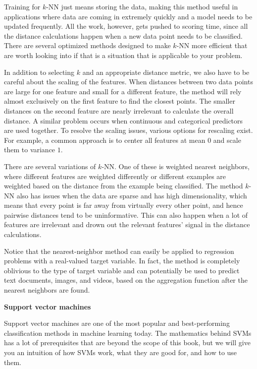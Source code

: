 \documentclass[]{krantz}
\begin{document}
Training for \(k\)-NN just means storing the data, making this method
useful in applications where data are coming in extremely quickly and a
model needs to be updated frequently. All the work, however, gets pushed
to scoring time, since all the distance calculations happen when a new
data point needs to be classified. There are several optimized methods
designed to make \(k\)-NN more efficient that are worth looking into if
that is a situation that is applicable to your problem.

In addition to selecting \(k\) and an appropriate distance metric, we
also have to be careful about the scaling of the features. When
distances between two data points are large for one feature and small
for a different feature, the method will rely almost exclusively on the
first feature to find the closest points. The smaller distances on the
second feature are nearly irrelevant to calculate the overall distance.
A similar problem occurs when continuous and categorical predictors are
used together. To resolve the scaling issues, various options for
rescaling exist. For example, a common approach is to center all
features at mean \(0\) and scale them to variance \(1\).

There are several variations of \(k\)-NN. One of these is weighted
nearest neighbors, where different features are weighted differently or
different examples are weighted based on the distance from the example
being classified. The method \(k\)-NN also has issues when the data are
sparse and has high dimensionality, which means that every point is far
away from virtually every other point, and hence pairwise distances tend
to be uninformative. This can also happen when a lot of features are
irrelevant and drown out the relevant features' signal in the distance
calculations.

Notice that the nearest-neighbor method can easily be applied to
regression problems with a real-valued target variable. In fact, the
method is completely oblivious to the type of target variable and can
potentially be used to predict text documents, images, and videos, based
on the aggregation function after the nearest neighbors are found.

\textbf{Support vector machines}

Support vector machines are one of the most popular and best-performing
classification methods in machine learning today. The mathematics behind
SVMs has a lot of prerequisites that are beyond the scope of this book,
but we will give you an intuition of how SVMs work, what they are good
for, and how to use them.
\end{document}

